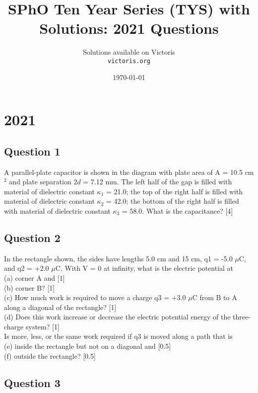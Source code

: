 \documentclass{article}
\title{SPhO Ten Year Series (TYS) with Solutions: 2021 Questions}
\author{
    Solutions available on Victoris\\
    \texttt{victoris.org}
}
\date{\today}
\begin{document}
\maketitle
\section{2021}
\subsection{Question 1}

A parallel-plate capacitor is shown in the diagram with plate area of A = 10.5 cm$^2$ and plate separation $2d$ = 7.12 mm. The left half of the gap is filled with material of dielectric constant $\kappa_1$ = 21.0; the top of the right half is filled with material of dielectric constant $\kappa_2$ = 
42.0; the bottom of the right half is filled with material of dielectric constant $\kappa_3$ = 58.0. What 
is the capacitance? [4]
\subsection{Question 2}
In the rectangle shown, the sides have lengths 5.0 cm and 15 cm, q1 = -5.0 $\mu$C, and q2 = +2.0 $\mu$C. With  V = 0 at infinity, what is the electric potential at\\
(a) corner A and [1]\\
(b) corner B? [1]\\
(c) How much work is required to move a charge 
q3 = +3.0 $\mu$C from B to A along a diagonal of the rectangle? [1]\\
(d) Does this work increase or decrease the electric potential energy of the three-charge system? [1]\\
Is more, less, or the same work required if q3 is moved along a path that is\\
(e) inside the rectangle but not on a diagonal and [0.5]\\
(f) outside the rectangle? [0.5]    
\subsection{Question 3}
\end{document}
